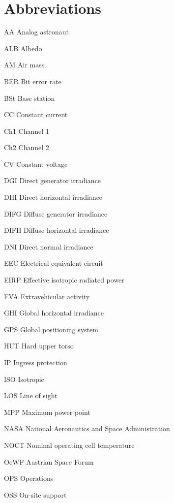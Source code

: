  
\chapter*{Abbreviations}
 
\begin{abbrev} %
\item[AA] 		Analog astronaut
\item[ALB]		Albedo
\item[AM]		Air mass
\item[BER]		Bit error rate
\item[BSt]		Base station
\item[CC]		Constant current
\item[Ch1]		Channel 1
\item[Ch2]		Channel 2
\item[CV]  		Constant voltage
\item[DGI]		Direct generator irradiance
\item[DHI]		Direct horizontal irradiance
\item[DIFG]		Diffuse generator irradiance
\item[DIFH]		Diffuse horizontal irradiance
\item[DNI]		Direct normal irradiance
\item[EEC]		Electrical equivalent circuit
\item[EIRP] 	Effective isotropic radiated power
\item[EVA]		Extravehicular activity
\item[GHI]		Global horizontal irradiance
\item[GPS]		Global positioning system
\item[HUT]		Hard upper torso
\item[IP]		Ingress protection
\item[ISO]		Isotropic
\item[LOS]		Line of sight
\item[MPP]		Maximum power point
\item[NASA]		National Aeronautics and Space Administration
\item[NOCT]		Nominal operating cell temperature
\item[OeWF]		Austrian Space Forum
\item[OPS]		Operations
\item[OSS]		On-site support

\end{abbrev}
